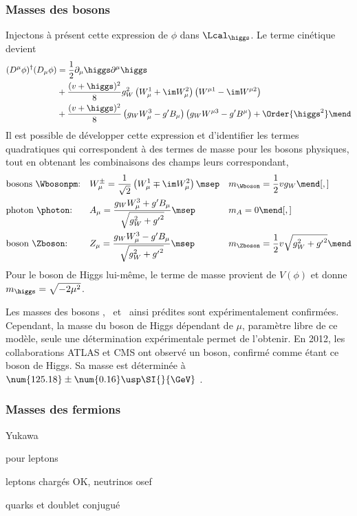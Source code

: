 \subsubsection{Masses des bosons}\label{chapter-MS-MSSM-section-formalisme-subsec-Higgs_mechanism-subsubsec-bosons}
Injectons à présent cette expression de $\phi$ dans $\Lcal_{\higgs}$. Le terme cinétique devient
\begin{align}
(D^\mu\phi)^\dagger(D_\mu\phi)
&
=
\frac{1}{2}\partial_\mu \higgs \partial^\mu \higgs
\nonumber\\&
+
\frac{(v+\higgs)^2}{8} g_W^2 \left(W_\mu^1 + \im W_\mu^2\right) \left( W^{\mu1}-\im W^{\mu2}\right)
\nonumber\\&
+
\frac{(v+\higgs)^2}{8} \left(g_W W_\mu^3 - g' B_\mu \right) \left( g_W W^{\mu3}-g' B^\mu \vphantom{W^{\mu1}}\right)
+ \Order{\higgs^2}
\mend
\end{align}
Il est possible de développer cette expression et d'identifier les termes quadratiques qui correspondent à des termes de masse pour les bosons physiques, tout en obtenant les combinaisons des champs leurs correspondant,
\begin{align}
&
\text{bosons \Wbosonpm:}
&&
W_\mu^\pm = \frac{1}{\sqrt{2}} \left( W_\mu^1 \mp \im W_\mu^2 \right)
\msep&&
m_{\Wboson} = \frac{1}{2} v g_W
\mend[,]
\\
&
\text{photon \photon:}
&&
A_\mu = \frac{g_W W_\mu^3 + g' B_\mu}{\sqrt{g_W^2 + {g'}^2}}
\msep&&
m_A = 0
\mend[,]
\\
&
\text{boson \Zboson:}
&&
Z_\mu = \frac{g_W W_\mu^3 - g' B_\mu}{\sqrt{g_W^2 + {g'}^2}}
\msep&&
m_{\Zboson} = \frac{1}{2} v \sqrt{g_W^2 + {g'}^2}
\mend
\end{align}
Pour le boson de Higgs lui-même, le terme de masse provient de $V(\phi)$ et donne $m_{\higgs} = \sqrt{-2\mu^2}$.
\par Les masses des bosons \Wbosonpm, \photon\ et \Zboson\ ainsi prédites sont expérimentalement confirmées.
Cependant, la masse du boson de Higgs dépendant de $\mu$, paramètre libre de ce modèle, seule une détermination expérimentale permet de l'obtenir. En 2012, les collaborations ATLAS et CMS ont observé un boson, confirmé comme étant ce boson de Higgs. Sa masse est déterminée à $\num{125.18}\pm\num{0.16}\usp\SI{}{\GeV}$ .
\subsubsection{Masses des fermions}\label{chapter-MS-MSSM-section-formalisme-subsec-Higgs_mechanism-subsubsec-fermions}
Yukawa

pour leptons

leptons chargés OK, neutrinos osef

quarks et doublet conjugué
